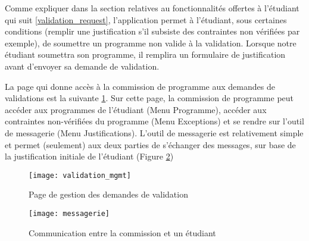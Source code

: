 Comme expliquer dans la section relatives au fonctionnalités offertes à l'étudiant qui suit \ref{validation_request}, l'application permet à l'étudiant, sous certaines conditions (remplir une justification s'il subsiste des contraintes non vérifiées par exemple), de soumettre un programme non valide à la validation. Lorsque notre étudiant soumettra son programme, il remplira un formulaire de justification avant d'envoyer sa demande de validation.

La page qui donne accès à la commission de programme aux demandes de validations est la suivante \ref{fig:validation_mgmt}. Sur cette page, la commission de programme peut accéder aux programmes de l'étudiant (Menu Programme), accéder aux contraintes non-vérifiées du programme (Menu Exceptions) et se rendre sur l'outil de messagerie (Menu Justifications). L'outil de messagerie est relativement simple et permet (seulement) aux deux parties de s'échanger des messages, sur base de la justification initiale de l'étudiant (Figure \ref{fig:messenger})



\begin{figure}
\centering
\caption{Page de gestion des demandes de validation}
\label{fig:validation_mgmt}
\texttt{[image: validation\_mgmt]}
\end{figure}

\begin{figure}
\centering
\caption{Communication entre la commission et un étudiant}
\label{fig:messenger}
\texttt{[image: messagerie]}
\end{figure}





